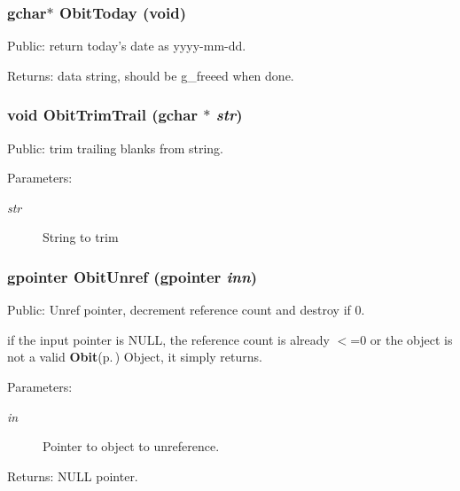 \subsubsection{\setlength{\rightskip}{0pt plus 5cm}gchar$\ast$ Obit\-Today (void)}\label{Obit_8h_a24}


Public: return today's date as yyyy-mm-dd. 

\begin{Desc}
\item[Returns:]data string, should be g\_\-freeed when done. \end{Desc}
\subsubsection{\setlength{\rightskip}{0pt plus 5cm}void Obit\-Trim\-Trail (gchar $\ast$ {\em str})}\label{Obit_8h_a22}


Public: trim trailing blanks from string. 

\begin{Desc}
\item[Parameters:]
\begin{description}
\item[{\em str}]String to trim \end{description}
\end{Desc}
\subsubsection{\setlength{\rightskip}{0pt plus 5cm}gpointer Obit\-Unref (gpointer {\em inn})}\label{Obit_8h_a19}


Public: Unref pointer, decrement reference count and destroy if 0. 

if the input pointer is NULL, the reference count is already $<$=0 or the object is not a valid {\bf Obit}{\rm (p.\,\pageref{structObit})} Object, it simply returns. \begin{Desc}
\item[Parameters:]
\begin{description}
\item[{\em in}]Pointer to object to unreference. \end{description}
\end{Desc}
\begin{Desc}
\item[Returns:]NULL pointer. \end{Desc}
